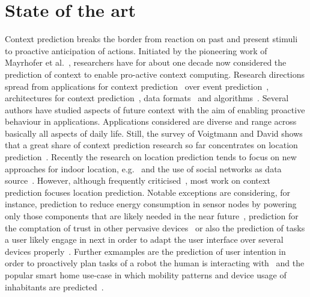 \section{State of the art}
\label{sec:stateOfTheArt}

Context prediction breaks the border from reaction on past and present stimuli to proactive anticipation of actions. 
Initiated by the pioneering work of Mayrhofer et al.~\cite{5013}, researchers have for about one decade now considered the prediction of context to enable pro-active context computing. 
Research directions spread from applications for context prediction~\cite{5035} over event prediction~\cite{5071}, architectures for context prediction~\cite{5001,5010,4027}, data formats~\cite{Prediction_Bannach_2010} and algorithms~\cite{Prediction_Intille_2006}. 
Several authors have studied aspects of future context with the aim of enabling proactive behaviour in applications. 
Applications considered are diverse and range across basically all aspects of daily life. 
Still, the survey of Voigtmann and David shows that a great share of context prediction research so far concentrates on location prediction~\cite{Prediction_Voigtmann_2012}. 
Recently the research on location prediction tends to focus on new approaches for indoor location, e.g.~\cite{Prediction_Ruscher_2012,Prediction_Murao_2012} and the use of social networks as data source~\cite{Prediction_Zhang_2012}. 
However, although frequently criticised~\cite{5088}, most work on context prediction focuses location prediction.
Notable exceptions are considering, for instance, prediction to reduce energy consumption in sensor nodes by powering only those components that are likely needed in the near future~\cite{ContextAwareness_Gordon_2011}, prediction for the comptation of trust in other pervasive devices~\cite{2040} or also the prediction of tasks a user likely engage in next in order to adapt the user interface over several devices properly~\cite{5019}.
Further exmamples are the prediction of user intention in order to proactively plan tasks of a robot the human is interacting with~\cite{5830} and the popular smart home use-case in which mobility patterns and device usage of inhabitants are predicted~\cite{5163}.


